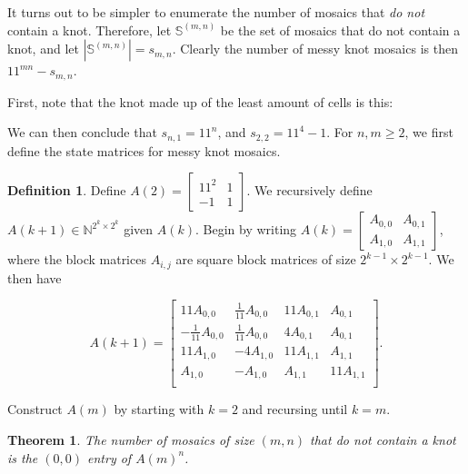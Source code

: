 \documentclass[12pt]{article}
\theoremstyle{plain}
\newtheorem{thm}{Theorem}[section]
\theoremstyle{definition}
\newtheorem{definition}{Definition}[section]
\theoremstyle{remark}
\theoremstyle{definition}
\newcommand{\cellA}[4]{\draw[red, thick, densely dotted] ( #1 + 0.5 , #2 ) arc(0:90:{0.5}); \draw[thick] ( #1 , #2 ) rectangle ( #3 , #4 );}
\newcommand{\cellB}[4]{\draw[red, thick, densely dotted] ( #1 + 1 , #2 + 0.5 ) arc(90:180:{0.5}); \draw[thick] ( #1 , #2 ) rectangle ( #3 , #4 );}
\newcommand{\cellC}[4]{\draw[red, thick, densely dotted] ( #1 + 0.5, #2 + 1 ) arc(180:270:{0.5}); \draw[thick] ( #1 , #2 ) rectangle ( #3 , #4 );}
\newcommand{\cellD}[4]{\draw[red, thick, densely dotted] ( #1 , #2 + 0.5 ) arc(-90:0:{0.5}); \draw[thick] ( #1 , #2 ) rectangle ( #3 , #4 );}
\begin{document}
It turns out to be simpler to enumerate the number of mosaics that \textit{do not} contain a knot. Therefore, let $\mathbb{S}^{(m,n)}$ be the set of mosaics that do not contain a knot, and let $|\mathbb{S}^{(m,n)}| = s_{m,n}$. Clearly the number of messy knot mosaics is then $11^{mn} - s_{m,n}$.

First, note that the knot made up of the least amount of cells is this: 

\begin{center}
\end{center}

We can then conclude that $s_{n,1}=11^n$, and $s_{2,2} = 11^4 - 1$. For $n,m \geq 2$, we first define the state matrices for messy knot mosaics.

\begin{definition}

Define $A(2) = \begin{bmatrix}
11^2 & 1 \\
-1 & 1
\end{bmatrix}$. We recursively define $A(k+1) \in \mathbb{N}^{2^{k} \times 2^{k}}$ given $A(k)$. Begin by writing
$
A(k) = \begin{bmatrix}
A_{0,0} & A_{0,1} \\
A_{1,0} & A_{1,1}
\end{bmatrix}
$, where the block matrices $A_{i,j}$ are square block matrices of size $2^{k-1} \times 2^{k-1}$. We then have

$$
A(k+1) = \begin{bmatrix}
    11A_{0,0} & \frac{1}{11}A_{0,0} & 11A_{0,1} & A_{0,1} \\
    -\frac{1}{11}A_{0,0} & \frac{1}{11}A_{0,0} & 4A_{0,1} & A_{0,1} \\
    11A_{1,0} & -4A_{1,0} & 11A_{1,1}  & A_{1,1} \\
    A_{1,0} & -A_{1,0} & A_{1,1} & 11A_{1,1} \\
\end{bmatrix}.
$$

Construct $A(m)$ by starting with $k=2$ and recursing until $k=m$. 

\end{definition}

\begin{thm}
\label{thm: messy mosaics}
The number of mosaics of size $(m,n)$ that \textit{do not} contain a knot is the $(0,0)$ entry of $A(m)^n$.
\end{thm}
\end{document}
